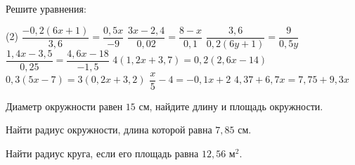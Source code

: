 \begin{homework}[number=4]
	\begin{listofex}
		\item Решите уравнения:
		\begin{tasks}(2)
			\task \( \dfrac{-0,2(6x+1)}{3,6}=\dfrac{0,5x}{-9} \)
			\task \( \dfrac{3x-2,4}{0,02}=\dfrac{8-x}{0,1} \)
			\task \( \dfrac{3,6}{0,2(6y+1)}=\dfrac{9}{0,5y} \)
			\task \( \dfrac{1,4x-3,5}{0,25}=\dfrac{4,6x-18}{-1,5} \)
			\task \( 4(1,2x+3,7)=0,2(2,6x-14) \)
			\task \( 0,3(5x-7)=3(0,2x+3,2) \)
			\task \( \dfrac{x}{5}-4=-0,1x+2 \)
			\task \( 4,37+6,7x=7,75+9,3x \)
		\end{tasks}
		\item Диаметр окружности равен \(15\) см, найдите длину и площадь окружности.
		\item Найти радиус окружности, длина которой равна \(7,85\) см.
		\item Найти радиус круга, если его площадь равна \(12,56\) м\(^2\).
	\end{listofex}
\end{homework}
